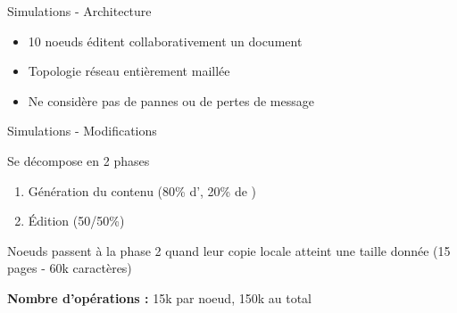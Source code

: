 \begin{frame}{Simulations - Architecture}
\begin{figure}
{
      }
    \end{figure}
    \begin{itemize}
      \item \alert{10 noeuds} éditent collaborativement un document
      \item Topologie \alert{réseau entièrement maillée}
      \item Ne considère \alert{pas de pannes ou de pertes de message}
    \end{itemize}
  \end{frame}

  \begin{frame}{Simulations - Modifications}
    \begin{block}{Se décompose en 2 phases}
      \begin{enumerate}
        \item \alert{Génération du contenu} (80\% d'\ins, 20\% de \rmv)
        \item \alert{Édition} (50/50\%)
      \end{enumerate}
      Noeuds passent à la phase 2 quand leur copie locale atteint une taille donnée (15 pages - 60k caractères)
    \end{block}
    \textbf{Nombre d'opérations : } 15k par noeud, 150k au total
  \end{frame}

